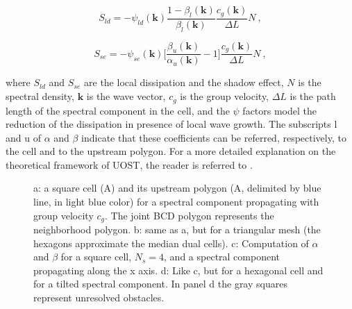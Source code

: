 \begin{equation}
S_{ld} = - \psi_{ld}(\mathbf{k}) \frac{1 - \beta_l(\mathbf{k})}{\beta_l(\mathbf{k})} \frac{c_g(\mathbf{k})}{\Delta L} N \ ,
\end{equation}

\begin{equation}
S_{se} = - \psi_{se}(\mathbf{k}) \bigg[ \frac{\beta_u(\mathbf{k})}{\alpha_u(\mathbf{k})} - 1 \bigg] \frac{c_g(\mathbf{k})}{\Delta L} N \ ,
\end{equation}

where $S_{ld}$ and $S_{se}$ are the local dissipation and the shadow effect,
$N$ is the spectral density, 
$\mathbf{k}$ is the wave vector, 
$c_g$ is the group velocity, $\Delta L$ is the path length of the spectral component 
in the cell, and the $\psi$ factors model the reduction of the dissipation in presence of
local wave growth. 
The subscripts l and u of $\alpha$ and $\beta$ indicate that these coefficients 
can be referred, respectively, to the cell and to the upstream polygon.
For a more detailed explanation on the theoretical framework of UOST, 
the reader is referred to
\citep{art:Mentaschi2015b, art:Mentaschi2018a}.


\begin{figure} \begin{center}
\caption{
a: a square cell (A) and its upstream polygon 
(A\textsc{}, delimited by blue line, in light blue color) for a spectral 
component propagating with group velocity $c_g$. 
The joint BCD polygon represents the neighborhood polygon. 
b: same as a, but for a triangular mesh (the hexagons approximate the median dual cells). 
c: Computation of $\alpha$ and $\beta$ for a square cell, $N_s=4$, 
and a spectral component propagating along the x axis. 
d: Like c, but for a hexagonal cell and for a tilted spectral component. 
In panel d the gray squares represent unresolved obstacles. 
}
\label{fig:UOST} \botline
\end{center}
\end{figure}


